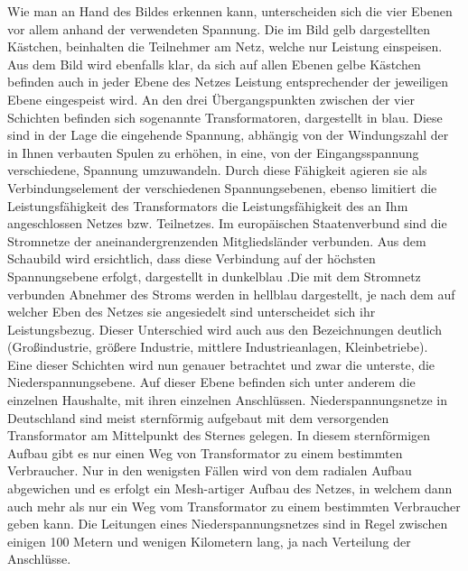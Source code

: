 Wie man an Hand des Bildes erkennen kann, unterscheiden sich die vier Ebenen vor allem anhand der verwendeten Spannung. Die im Bild gelb dargestellten Kästchen, beinhalten die Teilnehmer am Netz, welche nur Leistung einspeisen. Aus dem Bild wird ebenfalls klar, da sich auf allen Ebenen gelbe Kästchen befinden auch in jeder Ebene des Netzes Leistung entsprechender der jeweiligen Ebene eingespeist wird. An den drei Übergangspunkten zwischen der vier Schichten befinden sich sogenannte Transformatoren, dargestellt in blau. Diese sind in der Lage die eingehende Spannung, abhängig von der Windungszahl der in Ihnen verbauten Spulen zu erhöhen, in eine, von der Eingangsspannung verschiedene, Spannung umzuwandeln. Durch diese Fähigkeit agieren sie als Verbindungselement der verschiedenen Spannungsebenen, ebenso limitiert die Leistungsfähigkeit des Transformators die Leistungsfähigkeit des an Ihm angeschlossen Netzes bzw. Teilnetzes.
Im europäischen Staatenverbund sind die Stromnetze der aneinandergrenzenden Mitgliedsländer verbunden. Aus dem Schaubild wird ersichtlich, dass diese Verbindung auf der höchsten Spannungsebene erfolgt, dargestellt in dunkelblau .Die mit dem Stromnetz verbunden Abnehmer des Stroms werden in hellblau dargestellt, je nach dem auf welcher Eben des Netzes sie angesiedelt sind unterscheidet sich ihr Leistungsbezug. Dieser Unterschied wird auch aus den Bezeichnungen deutlich (Großindustrie, größere Industrie, mittlere Industrieanlagen, Kleinbetriebe). \\
Eine dieser Schichten wird nun genauer betrachtet und zwar die unterste, die Niederspannungsebene. Auf dieser Ebene befinden sich unter anderem die einzelnen Haushalte, mit ihren einzelnen Anschlüssen. Niederspannungsnetze in Deutschland sind meist sternförmig aufgebaut mit dem versorgenden Transformator am Mittelpunkt des Sternes gelegen. In diesem sternförmigen Aufbau gibt es nur einen Weg von Transformator zu einem bestimmten Verbraucher. Nur in den wenigsten Fällen wird von dem radialen Aufbau abgewichen und es erfolgt ein Mesh-artiger Aufbau des Netzes, in welchem dann auch mehr als nur ein Weg vom Transformator zu einem bestimmten Verbraucher geben kann. Die Leitungen eines Niederspannungsnetzes sind in Regel zwischen einigen 100 Metern und wenigen Kilometern lang, ja nach Verteilung der Anschlüsse. \\

